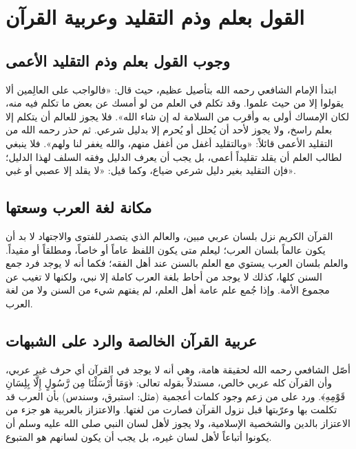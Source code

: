 \chapter{القول بعلم وذم التقليد وعربية القرآن}

\section{وجوب القول بعلم وذم التقليد الأعمى}
ابتدأ الإمام الشافعي رحمه الله بتأصيل عظيم، حيث قال: «فالواجب على العالِمين ألا يقولوا إلا من حيث علموا. وقد تكلم في العلم من لو أمسك عن بعض ما تكلم فيه منه، لكان الإمساك أولى به وأقرب من السلامة له إن شاء الله». فلا يجوز للعالم أن يتكلم إلا بعلم راسخ، ولا يجوز لأحد أن يُحلل أو يُحرم إلا بدليل شرعي.
ثم حذر رحمه الله من التقليد الأعمى قائلاً: «وبالتقليد أغفل من أغفل منهم، والله يغفر لنا ولهم». فلا ينبغي لطالب العلم أن يقلد تقليداً أعمى، بل يجب أن يعرف الدليل وفقه السلف لهذا الدليل؛ فإن التقليد بغير دليل شرعي ضياع، وكما قيل: «لا يقلد إلا عصبي أو غبي».

\section{مكانة لغة العرب وسعتها}
القرآن الكريم نزل بلسان عربي مبين، والعالم الذي يتصدر للفتوى والاجتهاد لا بد أن يكون عالماً بلسان العرب؛ ليعلم متى يكون اللفظ عاماً أو خاصاً، ومطلقاً أو مقيداً. والعلم بلسان العرب يستوي مع العلم بالسنن عند أهل الفقه؛ فكما أنه لا يوجد فرد جمع السنن كلها، كذلك لا يوجد من أحاط بلغة العرب كاملة إلا نبي، ولكنها لا تغيب عن مجموع الأمة. وإذا جُمع علم عامة أهل العلم، لم يفتهم شيء من السنن ولا من لغة العرب.

\section{عربية القرآن الخالصة والرد على الشبهات}
أصّل الشافعي رحمه الله لحقيقة هامة، وهي أنه لا يوجد في القرآن أي حرف غير عربي، وأن القرآن كله عربي خالص، مستدلاً بقوله تعالى: ﴿وَمَا أَرْسَلْنَا مِن رَّسُولٍ إِلَّا بِلِسَانِ قَوْمِهِ﴾. 
ورد على من زعم وجود كلمات أعجمية (مثل: استبرق، وسندس) بأن العرب قد تكلمت بها وعرّبتها قبل نزول القرآن فصارت من لغتها. والاعتزاز بالعربية هو جزء من الاعتزاز بالدين والشخصية الإسلامية، ولا يجوز لأهل لسان النبي صلى الله عليه وسلم أن يكونوا أتباعاً لأهل لسان غيره، بل يجب أن يكون لسانهم هو المتبوع.

